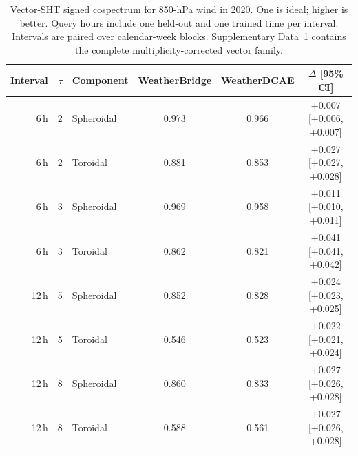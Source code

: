\begin{table}[!ht]
\centering
\caption{Vector-SHT signed cospectrum for 850-hPa wind in 2020. One is ideal; higher is better. Query hours include one held-out and one trained time per interval. Intervals are paired over calendar-week blocks. Supplementary Data~1 contains the complete multiplicity-corrected vector family.}
\label{tab:vector-sht}
\small
\begin{tabular}{@{}rrlccc@{}}
\toprule
Interval & $\tau$ & Component & WeatherBridge & WeatherDCAE & $\Delta$ [95\% CI] \\
\midrule
6\,h & 2 & Spheroidal & 0.973 & 0.966 & +0.007 [+0.006, +0.007] \\
6\,h & 2 & Toroidal & 0.881 & 0.853 & +0.027 [+0.027, +0.028] \\
6\,h & 3 & Spheroidal & 0.969 & 0.958 & +0.011 [+0.010, +0.011] \\
6\,h & 3 & Toroidal & 0.862 & 0.821 & +0.041 [+0.041, +0.042] \\
12\,h & 5 & Spheroidal & 0.852 & 0.828 & +0.024 [+0.023, +0.025] \\
12\,h & 5 & Toroidal & 0.546 & 0.523 & +0.022 [+0.021, +0.024] \\
12\,h & 8 & Spheroidal & 0.860 & 0.833 & +0.027 [+0.026, +0.028] \\
12\,h & 8 & Toroidal & 0.588 & 0.561 & +0.027 [+0.026, +0.028] \\
\bottomrule
\end{tabular}
\end{table}
